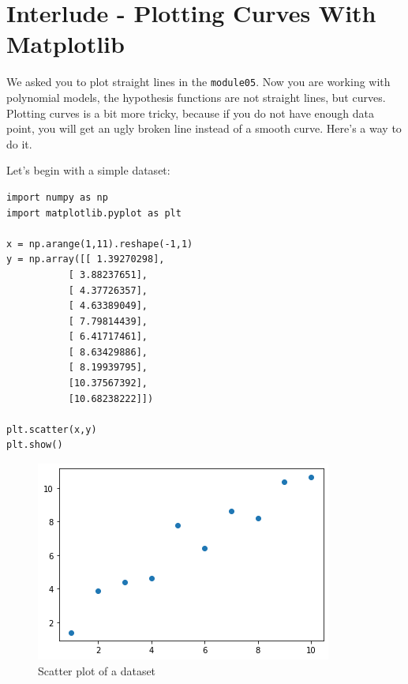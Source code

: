 
\section*{Interlude - Plotting Curves With Matplotlib}

We asked you to plot straight lines in the \texttt{module05}.
Now you are working with polynomial models, the hypothesis functions are not straight lines, but curves.
Plotting curves is a bit more tricky, because if you do not have enough data point, you will get an ugly broken line instead of a smooth curve.
Here's a way to do it.  

Let's begin with a simple dataset:

\begin{verbatim}
import numpy as np
import matplotlib.pyplot as plt

x = np.arange(1,11).reshape(-1,1)
y = np.array([[ 1.39270298],
           [ 3.88237651],
           [ 4.37726357],
           [ 4.63389049],
           [ 7.79814439],
           [ 6.41717461],
           [ 8.63429886],
           [ 8.19939795],
           [10.37567392],
           [10.68238222]])

plt.scatter(x,y)
plt.show()
\end{verbatim}

\begin{figure}[!h]
    \centering
    \includegraphics[scale=0.6]{assets/ex12_data.png}
    \caption{Scatter plot of a dataset}
\end{figure}

